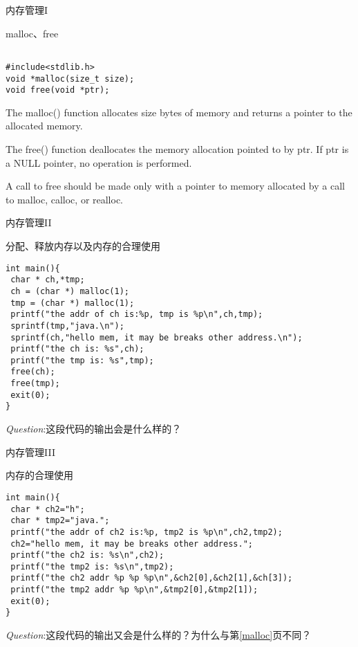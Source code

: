 \documentclass{beamer}
\begin{document}
\begin{frame}[fragile]{内存管理I}
\begin{block}{malloc、free}
\begin{lstlisting}

#include<stdlib.h>
void *malloc(size_t size);
void free(void *ptr);
\end{lstlisting}
\end{block}
The malloc() function allocates size bytes of memory and returns a pointer to the allocated memory.

The free() function deallocates the memory allocation pointed to by ptr. If ptr is a NULL pointer, no operation is performed.

A call to free should be made only with a pointer to memory allocated by a call to malloc, calloc, or realloc.
\end{frame}

\begin{frame}[fragile]{内存管理II}
\label{malloc}
\begin{block}{分配、释放内存以及内存的合理使用}
\begin{verbatim}
int main(){
 char * ch,*tmp;
 ch = (char *) malloc(1);
 tmp = (char *) malloc(1);
 printf("the addr of ch is:%p, tmp is %p\n",ch,tmp);
 sprintf(tmp,"java.\n");
 sprintf(ch,"hello mem, it may be breaks other address.\n");
 printf("the ch is: %s",ch);
 printf("the tmp is: %s",tmp);
 free(ch);
 free(tmp);
 exit(0);
}
\end{verbatim}
\end{block}
\emph{Question}:这段代码的输出会是什么样的？
\end{frame}

\begin{frame}[fragile]{内存管理III}
\label{m2}
\begin{block}{内存的合理使用}
\begin{verbatim}
int main(){
 char * ch2="h";
 char * tmp2="java.";
 printf("the addr of ch2 is:%p, tmp2 is %p\n",ch2,tmp2);
 ch2="hello mem, it may be breaks other address.";
 printf("the ch2 is: %s\n",ch2);
 printf("the tmp2 is: %s\n",tmp2);
 printf("the ch2 addr %p %p %p\n",&ch2[0],&ch2[1],&ch[3]);
 printf("the tmp2 addr %p %p\n",&tmp2[0],&tmp2[1]);
 exit(0);
}
\end{verbatim}
\end{block}
\emph{Question}:这段代码的输出又会是什么样的？为什么与第\ref{malloc}页不同？
\end{frame}

\end{document}
